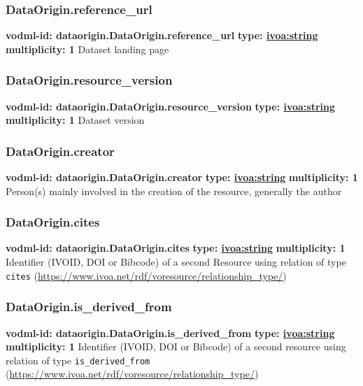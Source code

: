     \subsubsection{DataOrigin.reference\_url}
      \textbf{vodml-id: dataorigin.DataOrigin.reference\_url} \newline
      \textbf{type: \hyperref[sect:ivoa]{ivoa:string}} \newline
      \textbf{multiplicity: 1} \newline
      Dataset landing page

    \subsubsection{DataOrigin.resource\_version}
      \textbf{vodml-id: dataorigin.DataOrigin.resource\_version} \newline
      \textbf{type: \hyperref[sect:ivoa]{ivoa:string}} \newline
      \textbf{multiplicity: 1} \newline
      Dataset version

    \subsubsection{DataOrigin.creator}
      \textbf{vodml-id: dataorigin.DataOrigin.creator} \newline
      \textbf{type: \hyperref[sect:ivoa]{ivoa:string}} \newline
      \textbf{multiplicity: 1} \newline
      Person(s) mainly involved in the creation of the resource, generally the author

    \subsubsection{DataOrigin.cites}
      \textbf{vodml-id: dataorigin.DataOrigin.cites} \newline
      \textbf{type: \hyperref[sect:ivoa]{ivoa:string}} \newline
      \textbf{multiplicity: 1} \newline
      Identifier (IVOID, DOI or Bibcode) of a second Resource using relation of type \texttt{cites} (\url{https://www.ivoa.net/rdf/voresource/relationship\_type/})

    \subsubsection{DataOrigin.is\_derived\_from}
      \textbf{vodml-id: dataorigin.DataOrigin.is\_derived\_from} \newline
      \textbf{type: \hyperref[sect:ivoa]{ivoa:string}} \newline
      \textbf{multiplicity: 1} \newline
      Identifier (IVOID, DOI or Bibcode) of a second resource using relation of type \texttt{is\_derived\_from} (\url{https://www.ivoa.net/rdf/voresource/relationship\_type/})

